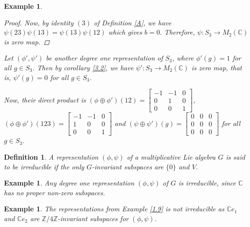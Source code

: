 \documentclass[10 pt,oneside,reqno,a4paper]{amsart}
\newtheorem{definition}{Definition}[section]
\newtheorem{example}[theorem]{Example}
\numberwithin{equation}{section}
\newcommand{\field}[1]{\mathbb{#1}}          \newcommand{\Q}{\field{Q}}
\newcommand{\C}{\field{C}}                   \newcommand{\A}{\field{A}}
\begin{document}
\begin{example}
\begin{proof}
Now, by identity $(3)$ of Definition \ref{A}, we have 
$\psi(23)\psi(13)=\psi(13)\psi(12)$ which gives $b=0.$ Therefore, $\psi: S_3 \to M_2(\mathbb{C})$ is zero map.
\end{proof} 








Let $(\phi',\psi')$ be another degree one representation of $S_3$, where $\phi'(g)=1$ for all $g\in S_3$. Then by corollary \ref{3.2}, we have $\psi':S_3 \to M_2(\C)$ is zero map, that is, $\psi'(g)=0$ for all $g\in S_3$.

Now, their direct product is $(\phi \oplus \phi')(12)=\begin{bmatrix}
        -1 & -1 & 0 \\ 0 & 1 & 0 \\ 0 & 0 &1
    \end{bmatrix}$, $(\phi \oplus \phi')(123)=\begin{bmatrix}
        -1 & -1 & 0 \\ 1 & 0 & 0 \\ 0 & 0 &1
    \end{bmatrix}$ and $(\psi \oplus \psi')(g)=\begin{bmatrix}
        0 & 0 & 0 \\ 0 & 0& 0 \\ 0 & 0 & 0
    \end{bmatrix}$ for all $g\in S_3$.

\end{example}






\begin{definition}
    A representation $(\phi,\psi)$ of a multiplicative Lie algebra $G$ is said to be irreducible if the only $G$-invariant subspaces are $\{0\}$ and $V$.
\end{definition}
\begin{example}
    Any degree one representation $(\phi,\psi)$ of $G$ is irreducible, since $\C$ has no proper non-zero subspaces.
\end{example}
\begin{example}
    The representations from Example \ref{1.9} is not irreducible as $\C e_1$ and $\C e_2$ are $\mathbb{Z}/4\mathbb{Z}$-invariant subspaces for $(\phi,\psi)$.
\end{example}
\end{document}
